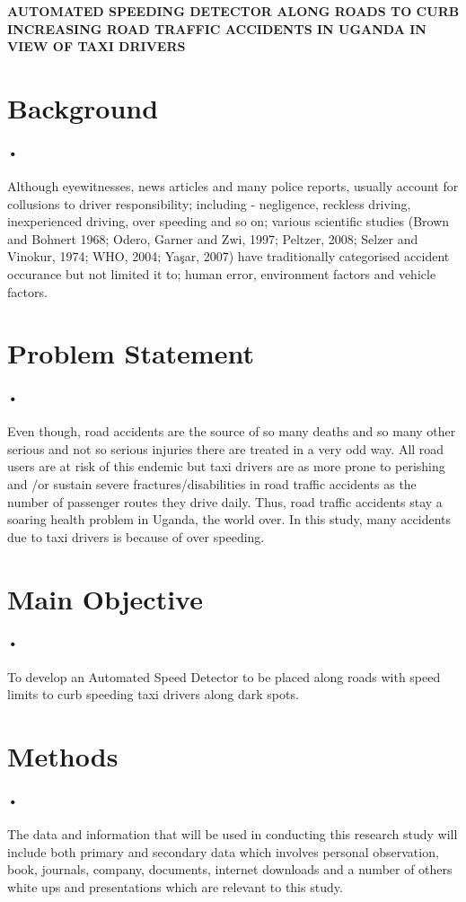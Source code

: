 \documentclass[12pt]{article}
\begin{document}
\newpage

\begin{center}
\textbf{AUTOMATED SPEEDING DETECTOR ALONG ROADS TO CURB INCREASING ROAD TRAFFIC ACCIDENTS IN UGANDA IN VIEW OF TAXI DRIVERS}\\
\end{center}

\section{Background}
\paragraph{•}
Although eyewitnesses, news articles and many police reports, usually account for collusions to driver responsibility; including - negligence, reckless driving, inexperienced driving, over speeding and so on; various scientific studies (Brown and Bohnert 1968; Odero, Garner and Zwi, 1997; Peltzer, 2008; Selzer and Vinokur, 1974; WHO, 2004; Yaşar, 2007) have traditionally categorised accident occurance but not limited it to; human error, environment factors and vehicle factors.

\section{Problem Statement}
\paragraph{•}
Even though, road accidents are the source of so many deaths and so many other serious and not so serious injuries there are treated in a very odd way. All road users are at risk of this endemic but taxi drivers are as more prone to perishing and /or sustain severe fractures/disabilities in road traffic accidents as the number of passenger routes they drive daily. Thus, road traffic accidents stay a soaring health problem in Uganda, the world over. In this study, many accidents due to taxi drivers is because of over speeding.
  
\section{Main Objective}
\paragraph{•}
To develop an Automated Speed Detector to be placed along roads with speed limits to curb speeding taxi drivers along dark spots.

\section{Methods}
\paragraph{•}
The data and information that will be used in conducting this research study will include both primary and secondary data which involves personal observation, book, journals, company, documents, internet downloads and a number of others white ups and presentations which are relevant to this study. 
\end{document}
